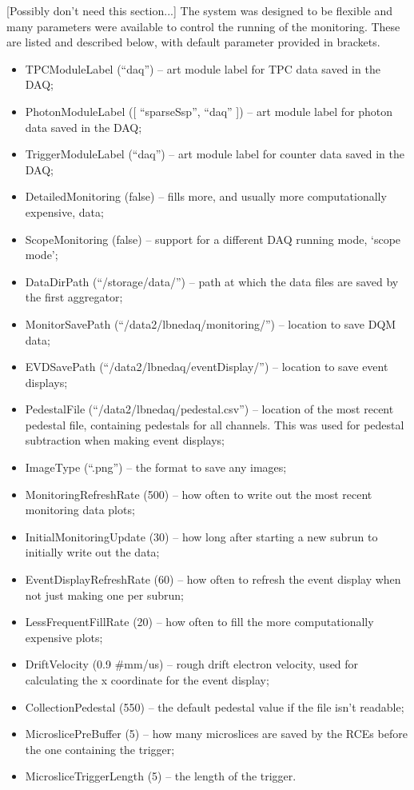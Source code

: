 [Possibly don't need this section...]
The system was designed to be flexible and many parameters were available to control the running of the monitoring.  These are listed and described below, with default parameter provided in brackets.

\begin{itemize}
\item TPCModuleLabel (``daq'') -- art module label for TPC data saved in the DAQ;
\item PhotonModuleLabel ([ ``sparseSsp'', ``daq'' ]) -- art module label for photon data saved in the DAQ;
\item TriggerModuleLabel (``daq'') -- art module label for counter data saved in the DAQ;
\item DetailedMonitoring (false) -- fills more, and usually more computationally expensive, data;
\item ScopeMonitoring (false) -- support for a different DAQ running mode, `scope mode';
\item DataDirPath (``/storage/data/'') -- path at which the data files are saved by the first aggregator;
\item MonitorSavePath (``/data2/lbnedaq/monitoring/'') -- location to save DQM data;
\item EVDSavePath (``/data2/lbnedaq/eventDisplay/'') -- location to save event displays;
\item PedestalFile (``/data2/lbnedaq/pedestal.csv'') -- location of the most recent pedestal file, containing pedestals for all channels.  This was used for pedestal subtraction when making event displays;
\item ImageType (``.png'') -- the format to save any images;
\item MonitoringRefreshRate (500) -- how often to write out the most recent monitoring data plots;
\item InitialMonitoringUpdate (30) -- how long after starting a new subrun to initially write out the data;
\item EventDisplayRefreshRate (60) -- how often to refresh the event display when not just making one per subrun;
\item LessFrequentFillRate (20) -- how often to fill the more computationally expensive plots;
\item DriftVelocity (0.9 \#mm/us) -- rough drift electron velocity, used for calculating the x coordinate for the event display;
\item CollectionPedestal (550) -- the default pedestal value if the file isn't readable;
\item MicroslicePreBuffer (5) -- how many microslices are saved by the RCEs before the one containing the trigger;
\item MicrosliceTriggerLength (5) -- the length of the trigger.
\end{itemize}

